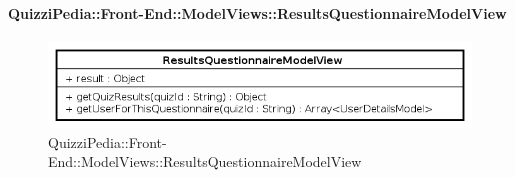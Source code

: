 \paragraph[QuizziPedia::Front-End::ModelViews\\::ResultsQuestionnaireModelView]{QuizziPedia::Front-End::ModelViews::ResultsQuestionnaireModelView}
	
	\label{QuizziPedia::Front-End::ModelViews::ResultsQuestionnaireModelView}
	
	\begin{figure}[ht]
		\centering
		\includegraphics[scale=0.8,keepaspectratio]{UML/Classi/Front-End/QuizziPedia_Front-end_ModelView_ResultsQuestionnaireModelView.png}
		\caption{QuizziPedia::Front-End::ModelViews::ResultsQuestionnaireModelView}
	\end{figure} \FloatBarrier
	
